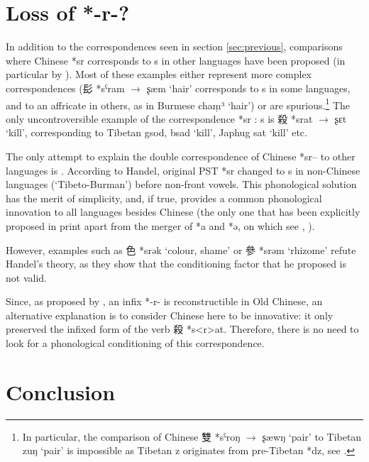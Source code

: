 \documentclass[oldfontcommands,oneside,a4paper,11pt]{article}
\newcommand{\ipa}[1]{{\phon #1}} %
\newcommand{\zh}[1]{{\cn #1}}
\begin{document}
\section{Loss of *-r-?}
In addition to the correspondences seen in section \ref{sec:previous}, comparisons where Chinese *\ipa{sr} corresponds to \ipa{s} in other languages have been proposed (in particular by \citealt{coblin86handlist}). Most of these examples either represent more complex correspondences (\zh{髟} *\ipa{sˁram} $\rightarrow$ \ipa{ʂæm} `hair' corresponds to \ipa{s} in some languages, and to an affricate in others, as in Burmese \ipa{chaṃ³} `hair') or are spurious.\footnote{In particular, the comparison of Chinese \zh{雙} *\ipa{sˁroŋ} $\rightarrow$ \ipa{ʂæwŋ} `pair' to Tibetan \ipa{zuŋ} `pair' is impossible as Tibetan \ipa{z} originates from pre-Tibetan *\ipa{dz}, see \citet{hill14dz}.}
The only uncontroversible example of the correspondence *\ipa{sr} : \ipa{s} is  \zh{殺} *\ipa{srat} $\rightarrow$ \ipa{ʂɛt} `kill', corresponding to Tibetan \ipa{gsod, bsad} `kill', Japhug \ipa{sat} `kill' etc.

The only attempt to explain the double correspondence of Chinese *\ipa{sr--} to other languages is \citet[25]{handel02r}. According to Handel, original PST *\ipa{sr} changed to s in non-Chinese languages (`Tibeto-Burman') before non-front vowels. This phonological solution has the merit of simplicity, and, if true, provides a common phonological innovation to all languages besides Chinese (the only one that has been explicitly proposed in print apart from the merger of *\ipa{a} and *\ipa{ə}, on which see \citealt{gong95st}, \citealt{handel08st}).

However, examples such as \zh{色} *\ipa{srək} `colour, shame' or \zh{參} *\ipa{srəm} `rhizome' refute Handel's theory, as they show that the conditioning factor that he proposed is not valid.

Since, as proposed by \citet{sagart99roc}, an infix *\ipa{-r-} is reconstructible in Old Chinese, an alternative explanation is to consider Chinese here to be innovative: it only preserved the infixed form of the verb \zh{殺} *\ipa{s<r>at}. Therefore, there is no need to look for a phonological conditioning of this correspondence.

\section{Conclusion}





\end{document}
